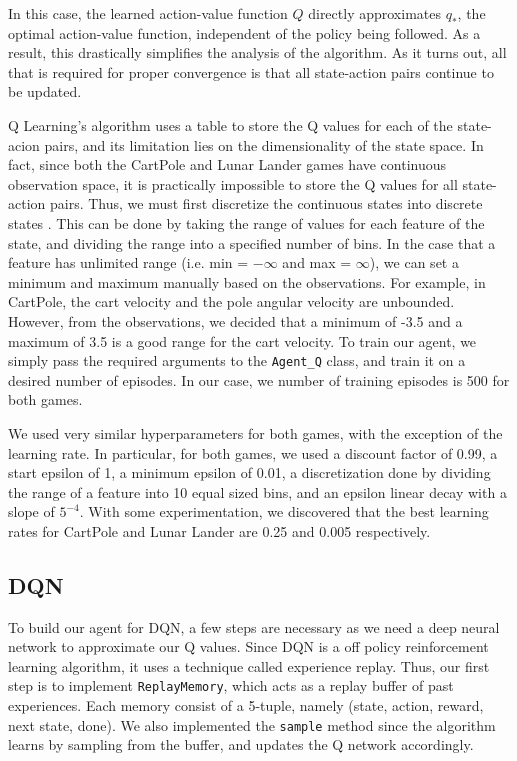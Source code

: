 \documentclass{article}
\begin{document}
In this case, the learned action-value function \(Q\) directly approximates
\(q_*\), the optimal action-value function, independent of the policy being
followed. As a result, this drastically simplifies the analysis of the
algorithm. As it turns out, all that is required for proper convergence is that
all state-action pairs continue to be updated\cite{sutton}.

Q Learning's algorithm uses a table to store the Q values for each of the
state-acion pairs, and its limitation lies on the dimensionality of the state
space. In fact, since both the CartPole and Lunar Lander games have continuous
observation space, it is practically impossible to store the Q values for all
state-action pairs. Thus, we must first discretize the continuous states into
discrete states \cite{discretization}. This can be done by taking the range of
values for each feature of the state, and dividing the range into a specified
number of bins. In the case that a feature has unlimited range (i.e. min =
\(-\infty\) and max = \(\infty\)), we can set a minimum and maximum manually
based on the observations. For example, in CartPole, the cart velocity and the
pole angular velocity are unbounded. However, from the observations, we decided
that a minimum of -3.5 and a maximum of 3.5 is a good range for the cart
velocity. To train our agent, we simply pass the required arguments to the
\verb+Agent_Q+ class, and train it on a desired number of episodes. In our
case, we number of training episodes is 500 for both games.

We used very similar hyperparameters for both games, with the exception of the
learning rate. In particular, for both games, we used a discount factor of
0.99, a start epsilon of 1, a minimum epsilon of 0.01, a discretization done by
dividing the range of a feature into 10 equal sized bins, and an epsilon linear
decay with a slope of \(5^{-4}\). With some experimentation, we discovered that
the best learning rates for CartPole and Lunar Lander are 0.25 and 0.005
respectively.

\subsection{DQN}
To build our agent for DQN, a few steps are necessary as we need a deep neural
network to approximate our Q values. Since DQN is a off policy reinforcement
learning algorithm, it uses a technique called experience replay. Thus, our
first step is to implement \verb+ReplayMemory+, which acts as a replay buffer
of past experiences. Each memory consist of a 5-tuple, namely (state, action,
reward, next state, done). We also implemented the \verb+sample+ method since
the algorithm learns by sampling from the buffer, and updates the Q network
accordingly.
\end{document}
